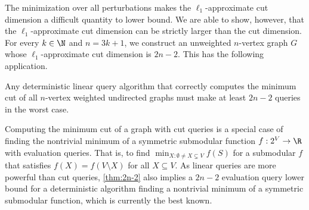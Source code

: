 The minimization over all perturbations makes the $\ell_1$-approximate cut dimension a difficult quantity to lower bound.  We are able to show, however, that the $\ell_1$-approximate cut
dimension can be strictly larger than the cut dimension.  For every $k \in \N$ and $n = 3k+1$, we construct an unweighted $n$-vertex graph $G$ whose $\ell_1$-approximate cut dimension is $2n-2$.
This has the following application.
\begin{theorem}
\label{thm:2n-2}
Any deterministic linear query algorithm that correctly computes the minimum cut of all $n$-vertex weighted undirected graphs must make
at least $2n-2$ queries in the worst case.
\end{theorem}

Computing the minimum cut of a graph with cut queries is a special case of finding the nontrivial minimum of a symmetric submodular function $f:2^V \rightarrow \R$ with evaluation queries.  That is,
to find $\min_{X: \emptyset \ne X \subsetneq V} f(S)$ for a submodular $f$ that satisfies $f(X) = f(V \setminus X)$ for all $X \subseteq V$.  As linear queries are more powerful than cut queries, \cref{thm:2n-2} also
implies a $2n-2$ evaluation query lower bound for a deterministic algorithm finding a nontrivial minimum of a symmetric submodular function, which is currently the best known.


























































